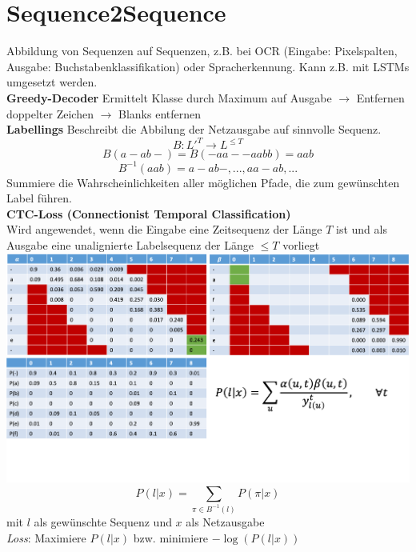 \documentclass[12pt]{article}
\begin{document}
	\section{Sequence2Sequence}
	Abbildung von Sequenzen auf Sequenzen, z.B. bei OCR (Eingabe: Pixelspalten, Ausgabe: Buchstabenklassifikation) oder Spracherkennung. Kann z.B. mit LSTMs umgesetzt werden.\\
	\textbf{Greedy-Decoder} Ermittelt Klasse durch Maximum auf Ausgabe $\rightarrow$ Entfernen doppelter Zeichen $\rightarrow$ Blanks entfernen\\
	\textbf{Labellings} Beschreibt die Abbilung der Netzausgabe auf sinnvolle Sequenz.
	$$B: L'^{T} \rightarrow L^{\leq T}$$
	$$B(a-ab-) = B(-aa--aabb) = aab$$
	$$B^{-1}(aab) = {a-ab-, ..., aa-ab, ...}$$
	Summiere die Wahrscheinlichkeiten aller möglichen Pfade, die zum gewünschten Label führen.\\
	\textbf{CTC-Loss (Connectionist Temporal Classification)}\\
	Wird angewendet, wenn die Eingabe eine Zeitsequenz der Länge $T$ ist und als Ausgabe eine unalignierte Labelsequenz der Länge $\leq T$ vorliegt\\
	\includegraphics[width=\linewidth]{figures/ctc-algorithmus.png}
	$$P(l|x) = \sum_{\pi \in B^{-1}(l)} P(\pi|x)$$
	mit $l$ als gewünschte Sequenz und $x$ als Netzausgabe\\
	\textit{Loss}: Maximiere $P(l|x)$ bzw. minimiere $-\log(P(l|x))$\\	
\end{document}
